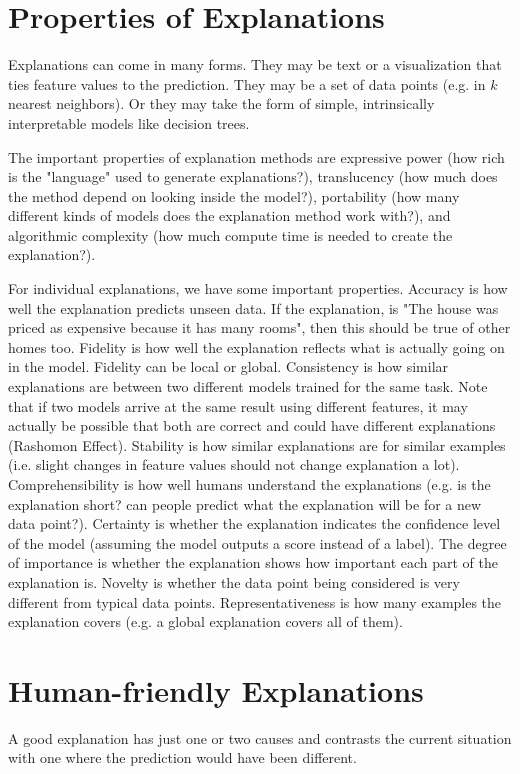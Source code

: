 \documentclass[a4paper]{article}
\begin{document}
\section{Properties of Explanations}
Explanations can come in many forms. They may be text or a visualization that
ties feature values to the prediction. They may be a set of data points (e.g.
in $k$ nearest neighbors). Or they may take the form of simple, intrinsically
interpretable models like decision trees.

The important properties of explanation methods are expressive power (how rich is
the "language" used to generate explanations?), translucency (how much does
the method depend on looking inside the model?), portability (how many different
kinds of models does the explanation method work with?), and algorithmic complexity
(how much compute time is needed to create the explanation?).

For individual explanations, we have some important properties. Accuracy is
how well the explanation predicts unseen data. If the explanation, is "The house
was priced as expensive because it has many rooms", then this should be true of
other homes too. Fidelity is how well the explanation reflects what is actually
going on in the model. Fidelity can be local or global. Consistency is how
similar explanations are between two different models trained for the same
task. Note that if two models arrive at the same result using different features,
it may actually be possible that both are correct and could have different
explanations (Rashomon Effect). Stability is how similar explanations are for
similar examples (i.e. slight changes in feature values should not change
explanation a lot). Comprehensibility is how well humans understand the
explanations (e.g. is the explanation short? can people predict what the
explanation will be for a new data point?). Certainty is whether the explanation
indicates the confidence level of the model (assuming the model outputs a score
instead of a label). The degree of importance is whether the explanation shows
how important each part of the explanation is. Novelty is whether the data point
being considered is very different from typical data points. Representativeness
is how many examples the explanation covers (e.g. a global explanation covers
all of them).

\section{Human-friendly Explanations}
A good explanation has just one or two causes and contrasts the current situation
with one where the prediction would have been different.
\end{document}
